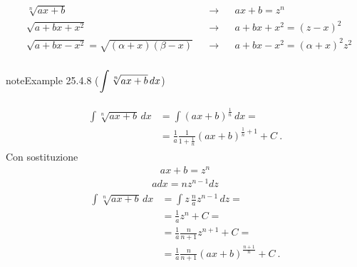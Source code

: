 \documentclass[letterpaper,10pt,italian]{jupyterBook}
\begin{document}
\sphinxAtStartPar
{}
\begin{equation*}
\begin{split}\begin{aligned}
  & \sqrt[n]{ax + b}                                     && \rightarrow && ax + b = z^n \\
  & \sqrt{a + bx + x^2}                                  && \rightarrow && a + bx + x^2 = ( z - x )^2 \\
  & \sqrt{a + bx - x^2} = \sqrt{(\alpha + x)(\beta - x)} && \rightarrow && a + bx - x^2 = ( \alpha + x )^2 z^2 \\
\end{aligned}\end{split}
\end{equation*}\label{ch/infinitesimal_calculus/integrals:example-13}
\begin{sphinxadmonition}{note}{Example 25.4.8 (\protect\(\displaystyle \int \sqrt[n]{ax+b} \, dx \protect\))}



\sphinxAtStartPar
{}
\begin{equation*}
\begin{split}\begin{aligned}
  \int \sqrt[n]{ax+ b} \, dx
 & =  \int \left( ax+ b \right)^{\frac{1}{n}} \, dx = \\
 & = \frac{1}{a} \frac{1}{1+ \frac{1}{n}} (a x + b)^{\frac{1}{n}+1} + C \ .
\end{aligned}\end{split}
\end{equation*}
\sphinxAtStartPar
{} Con sostituzione
\begin{equation*}
\begin{split}a x + b = z^n\end{split}
\end{equation*}\begin{equation*}
\begin{split}a dx = n z^{n-1} dz\end{split}
\end{equation*}\begin{equation*}
\begin{split}\begin{aligned}
  \int \sqrt[n]{ax+b} \, dx
  & = \int z \, \frac{n}{a} z^{n-1} \, dz = \\
  & = \frac{1}{a} z^{n} + C = \\
  & = \frac{1}{a} \frac{n}{n+1} z^{n+1} + C = \\
  & = \frac{1}{a} \frac{n}{n+1} (ax+b)^{\frac{n+1}{n}} + C  \ .
\end{aligned}\end{split}
\end{equation*}\end{sphinxadmonition}
\end{document}
